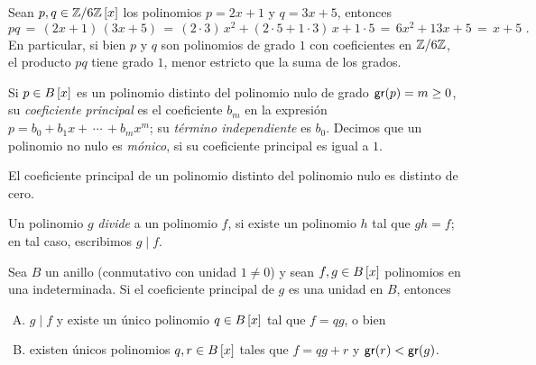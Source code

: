 \begin{ejemPolinomios}\label{ejem:polinomios:grado}
	Sean $p,q\in\polinomios[x]{\Enterosmod[6]}$ los polinomios
	$p=2x+1$ y $q=3x+5$, entonces
	\begin{displaymath}
		pq\,=\,(2x+1)\,(3x+5)\,=\,(2\cdot 3)\,x^2+
			(2\cdot 5+1\cdot 3)\,x+1\cdot 5\,=\,
			6 x^2+13 x+5\,=\,x+5
		\text{ .}
	\end{displaymath}
	En particular, si bien $p$ y $q$ son polinomios de grado $1$ con
	coeficientes en $\Enterosmod[6]$, el producto $pq$ tiene grado
	$1$, menor estricto que la suma de los grados.
\end{ejemPolinomios}

\begin{defPolinomios}\label{def:polinomios:coeficientes}
	Si $p\in\polinomios[x] B$ es un polinomio distinto del polinomio
	nulo de grado $\grado(p)=m\geq 0$, su \emph{coeficiente principal}
	es el coeficiente $b_m$ en la expresi\'on
	$p=b_0+b_1x+\,\cdots\,+b_mx^m$; su \emph{t\'ermino independiente}
	es $b_0$. Decimos que un polinomio no nulo es \emph{m\'onico},
	si su coeficiente principal es igual a $1$.
\end{defPolinomios}

\begin{obsPolinomios}\label{obs:polinomios:coeficientes}
	El coeficiente principal de un polinomio distinto del polinomio
	nulo es distinto de cero.
\end{obsPolinomios}

\begin{defPolinomios}\label{def:polinomios:divisibilidad}
	Un polinomio $g$ \emph{divide} a un polinomio $f$, si existe un
	polinomio $h$ tal que $gh=f$; en tal caso, escribimos $g\mid f$.
\end{defPolinomios}

\begin{teoPolinomios}\label{teo:polinomios:algoritmo}
	Sea $B$ un anillo (conmutativo con unidad $1\neq 0$) y sean
	$f,g\in\polinomios[x] B$ polinomios en una indeterminada.
	Si el coeficiente principal de $g$ es una unidad en $B$, entonces
	\begin{enumerate}[(A)]
		\item\label{item:teo:polinomios:algoritmo:1}
			$g\mid f$ y existe un \'unico polinomio
			$q\in\polinomios[x] B$ tal que $f=qg$, o bien
		\item\label{item:teo:polinomios:algoritmo:2}
			existen \'unicos polinomios $q,r\in\polinomios[x] B$
			tales que $f=qg+r$ y $\grado(r)<\grado(g)$.
	\end{enumerate}
\end{teoPolinomios}

